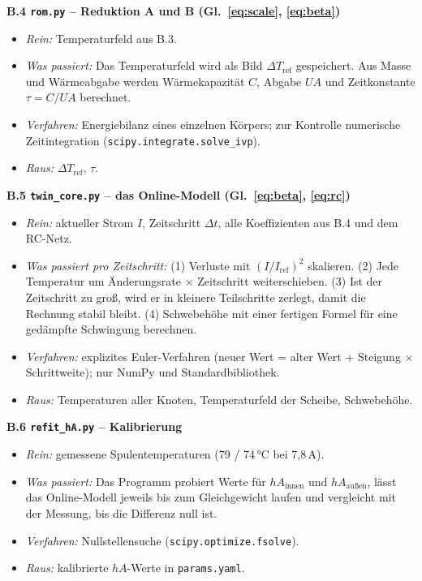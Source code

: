 \documentclass[a4paper, 10pt, conference]{ieeeconf}
\newcommand{\anh}[1]{\par\medskip\noindent\textbf{#1}\quad}
\begin{document}
\anh{B.4 \texttt{rom.py} -- Reduktion A und B (Gl.~\ref{eq:scale}, \ref{eq:beta})}
\begin{itemize}[leftmargin=*, nosep]
  \item \textit{Rein:} Temperaturfeld aus B.3.
  \item \textit{Was passiert:} Das Temperaturfeld wird als \glqq Bild\grqq{}
        $\Delta T_{\mathrm{ref}}$ gespeichert. Aus Masse und Wärmeabgabe
        werden Wärmekapazität $C$, Abgabe $UA$ und Zeitkonstante
        $\tau = C/UA$ berechnet.
  \item \textit{Verfahren:} Energiebilanz eines einzelnen Körpers; zur
        Kontrolle numerische Zeitintegration
        (\texttt{scipy.integrate.solve\_ivp}).
  \item \textit{Raus:} $\Delta T_{\mathrm{ref}}$, $\tau$.
\end{itemize}

\anh{B.5 \texttt{twin\_core.py} -- das Online-Modell (Gl.~\ref{eq:beta}, \ref{eq:rc})}
\begin{itemize}[leftmargin=*, nosep]
  \item \textit{Rein:} aktueller Strom $I$, Zeitschritt $\Delta t$, alle
        Koeffizienten aus B.4 und dem RC-Netz.
  \item \textit{Was passiert pro Zeitschritt:} (1) Verluste mit
        $(I/I_{\mathrm{ref}})^2$ skalieren. (2) Jede Temperatur um
        \glqq Änderungsrate $\times$ Zeitschritt\grqq{} weiterschieben. (3) Ist
        der Zeitschritt zu groß, wird er in kleinere Teilschritte zerlegt,
        damit die Rechnung stabil bleibt. (4) Schwebehöhe mit einer fertigen
        Formel für eine gedämpfte Schwingung berechnen.
  \item \textit{Verfahren:} explizites Euler-Verfahren (\glqq neuer Wert =
        alter Wert + Steigung $\times$ Schrittweite\grqq{}); nur NumPy und
        Standardbibliothek.
  \item \textit{Raus:} Temperaturen aller Knoten, Temperaturfeld der
        Scheibe, Schwebehöhe.
\end{itemize}

\anh{B.6 \texttt{refit\_hA.py} -- Kalibrierung}
\begin{itemize}[leftmargin=*, nosep]
  \item \textit{Rein:} gemessene Spulentemperaturen (79 / 74\,°C bei
        7,8\,A).
  \item \textit{Was passiert:} Das Programm probiert Werte für
        $hA_{\text{innen}}$ und $hA_{\text{außen}}$, lässt das
        Online-Modell jeweils bis zum Gleichgewicht laufen und vergleicht mit
        der Messung, bis die Differenz null ist.
  \item \textit{Verfahren:} Nullstellensuche
        (\texttt{scipy.optimize.fsolve}).
  \item \textit{Raus:} kalibrierte $hA$-Werte in \texttt{params.yaml}.
\end{itemize}
\end{document}
